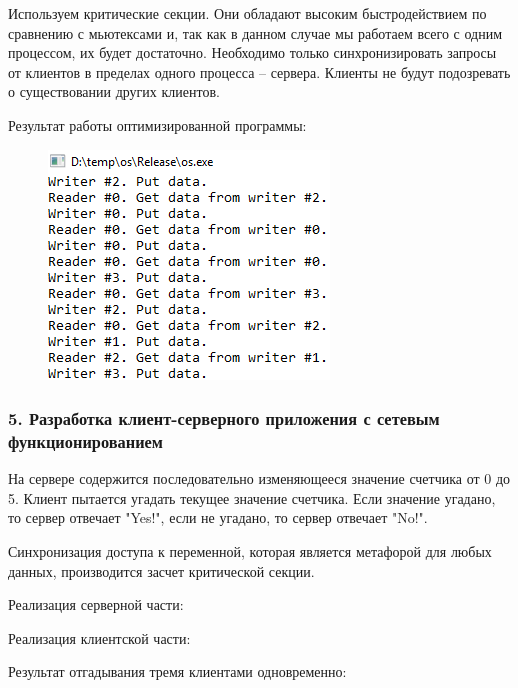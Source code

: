 \documentclass[14pt,a4paper,report]{report}
\begin{document}
Используем критические секции. Они обладают высоким быстродействием по сравнению с мьютексами и, так как в данном случае мы работаем всего с одним процессом, их будет достаточно. Необходимо только синхронизировать запросы от клиентов в пределах одного процесса – сервера. Клиенты не будут подозревать о существовании других клиентов.



Результат работы оптимизированной программы:

\begin{figure}[h!]
	\centering
	\includegraphics[scale = 0.95]{images/p2_4.png}
	
	\caption{}
	\label{image:16}
\end{figure}

\subsubsection{5. Разработка клиент-серверного приложения с сетевым функционированием}

На сервере содержится последовательно изменяющееся значение счетчика от 0 до 5. Клиент пытается угадать текущее значение счетчика. Если значение угадано, то сервер отвечает "Yes!", если не угадано, то сервер отвечает "No!".

Синхронизация доступа к переменной, которая является метафорой для любых данных, производится засчет критической секции.

Реализация серверной части:



Реализация клиентской части:



Результат отгадывания тремя клиентами одновременно:
\end{document}
